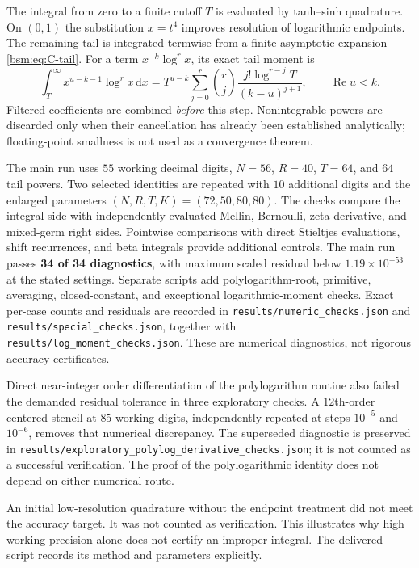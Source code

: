 \documentclass[11pt,letterpaper]{article}
\numberwithin{equation}{section}
\theoremstyle{definition}\newtheorem{definition}[theorem]{Definition}
\theoremstyle{remark}\newtheorem{remark}[theorem]{Remark}
\DeclareMathOperator{\Ree}{Re}
\newcommand{\dd}{\,\mathrm{d}}
\begin{document}
The integral from zero to a finite cutoff $T$ is evaluated by
tanh--sinh quadrature. On $(0,1)$ the substitution $x=t^4$ improves
resolution of logarithmic endpoints. The remaining tail is integrated
termwise from a finite asymptotic expansion \eqref{bsm:eq:C-tail}. For a
term $x^{-k}\log^r x$, its exact tail moment is
\begin{equation}\label{bsm:eq:log-tail}
 \int_T^\infty x^{u-k-1}\log^r x\dd x
 =T^{u-k}\sum_{j=0}^{r}\binom rj
               \frac{j!\log^{r-j}T}{(k-u)^{j+1}},\qquad\Ree u<k.
\end{equation}
Filtered coefficients are combined \emph{before} this step.
Nonintegrable powers are discarded only when their cancellation has
already been established analytically; floating-point smallness is
not used as a convergence theorem.

The main run uses $55$ working decimal digits, $N=56$, $R=40$,
$T=64$, and $64$ tail powers. Two selected identities are repeated
with $10$ additional digits and the enlarged parameters
$(N,R,T,K)=(72,50,80,80)$. The checks compare the integral side with
independently evaluated Mellin, Bernoulli, zeta-derivative, and mixed-germ
right sides. Pointwise comparisons with direct Stieltjes evaluations,
shift recurrences, and beta integrals provide additional controls.
The main run passes \textbf{34 of 34 diagnostics}, with maximum
scaled residual below $1.19\times10^{-53}$ at the stated settings.
Separate scripts add polylogarithm-root, primitive, averaging,
closed-constant, and exceptional logarithmic-moment checks. Exact per-case counts and residuals are
recorded in \texttt{results/numeric\_checks.json} and
\texttt{results/special\_checks.json}, together with
\texttt{results/log\_moment\_checks.json}. These are numerical diagnostics,
not rigorous accuracy certificates.

Direct near-integer order differentiation of the polylogarithm routine
also failed the demanded residual tolerance in three exploratory
checks. A $12$th-order centered stencil at $85$ working digits,
independently repeated at steps $10^{-5}$ and $10^{-6}$, removes that
numerical discrepancy. The superseded diagnostic is preserved in
\texttt{results/exploratory\_polylog\_derivative\_checks.json}; it is
not counted as a successful verification. The proof of the
polylogarithmic identity does not depend on either numerical route.

An initial low-resolution quadrature without the endpoint treatment
did not meet the accuracy target. It was not counted as verification.
This illustrates why high working precision alone does not certify
an improper integral. The delivered script records its method and
parameters explicitly.
\end{document}
